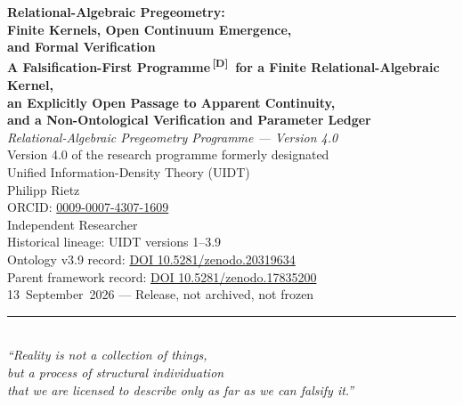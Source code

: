 \documentclass[12pt,a4paper,twoside]{article}
\theoremstyle{plain}
\theoremstyle{definition}
\theoremstyle{remark}
\newcommand{\catmark}[1]{\textsuperscript{\textsf{\textbf{[#1]}}}}
\begin{document}
\pagestyle{uidtontology}

\begin{titlepage}
\vspace*{1.6cm}
\begin{center}
{\LARGE\bfseries Relational-Algebraic Pregeometry:\\[0.25em]
Finite Kernels, Open Continuum Emergence,\\[0.25em]
and Formal Verification}\\[0.9em]
{\small\bfseries A Falsification-First Programme\,\catmark{D}\ for a Finite Relational-Algebraic Kernel,\\[0.25em]
an Explicitly Open Passage to Apparent Continuity,\\[0.25em]
and a Non-Ontological Verification and Parameter Ledger}\\[1.5em]
{\large\itshape Relational-Algebraic Pregeometry Programme --- Version 4.0}\\[0.5em]
{\small Version 4.0 of the research programme formerly designated\\
Unified Information-Density Theory (UIDT)}\\[2.6em]
{\small Philipp Rietz}\\[0.5em]
{\small ORCID: \href{https://orcid.org/0009-0007-4307-1609}{0009-0007-4307-1609}}\\[0.2em]
{\small Independent Researcher}\\[3em]
{\normalsize Historical lineage: UIDT versions 1--3.9}\\[0.5em]
{\small Ontology v3.9 record:
\href{https://doi.org/10.5281/zenodo.20319634}{DOI 10.5281/zenodo.20319634}}\\[0.25em]
{\small Parent framework record:
\href{https://doi.org/10.5281/zenodo.17835200}{DOI 10.5281/zenodo.17835200}}\\[0.5em]
{\small 13~September~2026 --- Release, not archived, not frozen}\\[2.2em]
\rule{0.6\textwidth}{0.4pt}\\[1em]
{\small\itshape ``Reality is not a collection of things,\\
but a process of structural individuation\\
that we are licensed to describe only as far as we can falsify it.''}\\[1.4em]
\end{center}
\end{titlepage}
\end{document}
